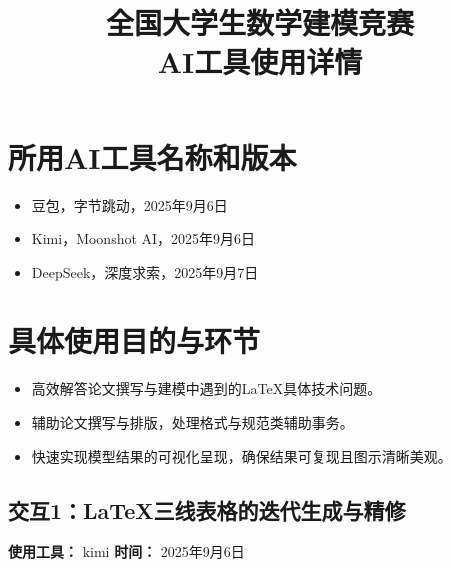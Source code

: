 \documentclass[12pt,a4paper]{article}
\title{\heiti 全国大学生数学建模竞赛\\AI工具使用详情}
\date{}
\begin{document}
\maketitle

\vspace{-5em}
\section{所用AI工具名称和版本}
\begin{itemize}
    \item 豆包，字节跳动，2025年9月6日
    \item Kimi，Moonshot AI，2025年9月6日
    \item DeepSeek，深度求索，2025年9月7日
\end{itemize}

\section{具体使用目的与环节}
\begin{itemize}
    \item 高效解答论文撰写与建模中遇到的LaTeX具体技术问题。
    \item 辅助论文撰写与排版，处理格式与规范类辅助事务。
    \item 快速实现模型结果的可视化呈现，确保结果可复现且图示清晰美观。
\end{itemize}
\vspace{1em}
\subsection*{交互1：LaTeX三线表格的迭代生成与精修}
\textbf{使用工具：} kimi \quad \textbf{时间：} 2025年9月6日
\end{document}
